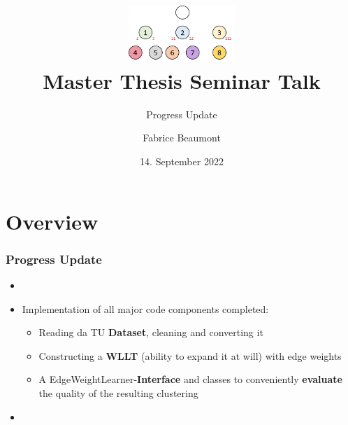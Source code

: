 

\title[MA Seminar Talk - Progress]{
	\centering
	\includegraphics[width=0.3\textwidth]{images/WLLT}\\
	Master Thesis Seminar Talk	
}
\subtitle{Progress Update}
\author[F. Beaumont]{Fabrice Beaumont}
\date{14. September 2022}

\newcommand{\figureWidth}{7cm}
\newcommand{\figureHorizontal}{2cm}
\newcommand{\figureVertical}{5cm}



\begin{frame}
	\titlepage
\end{frame}

\section{Overview}

\begin{frame}
\frametitle{Progress Update} \vspace{-1cm}
	\begin{itemize}
		\item[]
		\item Implementation of all major code components completed: \newline
		\begin{itemize}
			\item Reading da TU \textbf{Dataset}, cleaning and converting it \newline
			\item Constructing a \textbf{WLLT} (ability to expand it at will) with edge weights \newline
			\item A EdgeWeightLearner-\textbf{Interface} and classes to conveniently \textbf{evaluate} the quality of the resulting clustering \newline
		\end{itemize}
		\item[]
	\end{itemize}
\end{frame}

